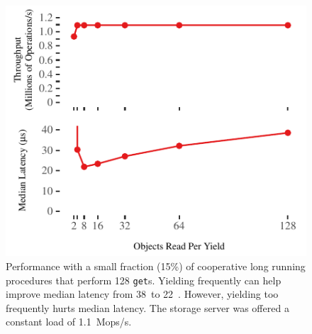 \begin{figure}[t]
\centering
\includegraphics[width=1.0\columnwidth]{graphs/long-cooperative.pdf}
	\caption{Performance with a small fraction (15\%) of cooperative long
	running procedures that perform 128 \texttt{get}s. Yielding
	frequently can help improve median latency from 38~\us to
	22~\us. However, yielding
	too frequently hurts median latency. The storage server was
	offered a constant load of 1.1~Mops/s.}
\label{fig:long-cooperative}
\end{figure}
